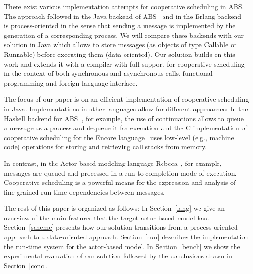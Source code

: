 There exist various implementation attempts for cooperative scheduling in ABS. 
The approach followed in the Java backend of ABS~\cite{abs,Schafer} and in the Erlang backend~\cite{Erlang} is process-oriented in the sense that sending a message is implemented by the generation of a corresponding process. We will compare these backends with our solution in Java which allows to store messages (as objects of type Callable or Runnable) before executing them (data-oriented). Our solution builds on this work and extends it with a compiler with full support for cooperative scheduling in the context of both synchronous and asynchronous calls, functional programming and foreign language interface. 

The focus of our paper is on an efficient implementation of cooperative scheduling in Java.
Implementations in other languages allow for different approaches:
In the Haskell backend for ABS~\cite{Haskell}, for example, the use of continuations allows
to queue a message as a process and dequeue it for execution and the C implementation of cooperative scheduling for the
Encore language~\cite{Encore} uses low-level (e.g., machine code) operations for
storing and retrieving call stacks from memory.

In contrast, in the Actor-based modeling language Rebeca~\cite{Sirjani}, for example,
messages are queued and processed in a run-to-completion mode of execution.
Cooperative scheduling is a powerful means for the expression and analysis
of fine-grained run-time dependencies between messages.

The rest of this paper is organized as follows: In Section~\ref{lang} we give an overview of the main features that the target actor-based model has. Section~\ref{scheme} presents how our solution transitions from a process-oriented approach to a data-oriented approach. Section~\ref{run} describes the implementation the run-time system for the actor-based model. In Section~\ref{bench} we show the experimental evaluation of our solution followed by the conclusions drawn in Section~\ref{conc}.






